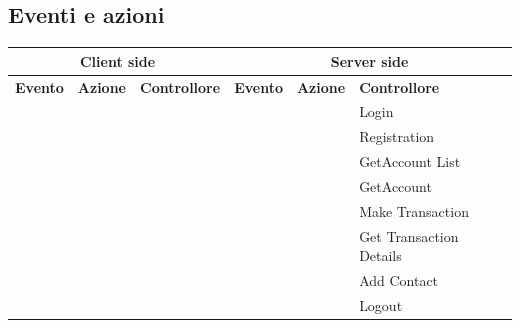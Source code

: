 \documentclass{article}
\begin{document}
\subsection{Eventi e azioni}
\begin{table}[H]
	\begin{center}
		\begin{tabular}{|p{2cm}|p{2cm}|p{2cm}|p{2cm}|p{2cm}|p{2cm}|}			
			\hline
			 \multicolumn{3}{|c|}{\textbf{Client side}} & \multicolumn{3}{c|}{\textbf{Server side}} \\
			 \hline
			 \textbf{Evento} & \textbf{Azione} & \textbf{Controllore} & \textbf{Evento} & \textbf{Azione} & \textbf{Controllore} \\
			\hline
			\centering{index → login form → submit} & \centering{Controllo dati} & \centering{function makeCall} &\centering{iPOST usr psw} & \centering{Controllo credenziali} & Login\\
			\hline
			\centering{registration → registration form → submit} & \centering{Controllo dati}  & \centering{function makeCall} &\centering{POST usr email psw control name surname} & \centering{Validazione e controllo dati e creazione utente} & Registration\\
			\hline
			\centering{AppPage → load} & \centering{Update view con lista account e update sidebar e navbar}  & \centering{function homeView} &\centering{GET} & \centering{Estrazione lista account dell'utente} & GetAccount List\\
			\hline
			\centering{AppPage → select account} & \centering{Update view con dettagli account  e update sidebar e navbar}  & \centering{function accountView} &\centering{GET accountId} & \centering{Estrazione dettagli account dell'utente} & GetAccount\\
			\hline
			\centering{AppPage → make transaction} & \centering{Controllo validità parametri}  & \centering{function makeCall} &\centering{POST origin destination amount reason username} & \centering{Validazione e verifica parametri e condizioni necessarie. Esecuzione della transazione} & Make Transaction\\
			\hline
			\centering{AppPage → show transaction outcome} & \centering{Update view con modal con dettagli della transazione}  & \centering{function transactionView} &\centering{GET transactionId} & \centering{Estrazione dettagli transazione} & Get Transaction Details\\
			\hline
			\centering{AppPage → add contact} & \centering{Update view con messaggio di esito aggiunta contatto}  & \centering{function makeCall} &\centering{POST account} & \centering{Controllo parametri e aggiunta contatto a rubrica} & Add Contact\\
			\hline
			\centering{AppPage → logout} & \centering{Pulizia localStorage}  & \centering{function logout()} &\centering{GET} & \centering{Chiusura della sessione} & Logout\\
			\hline
		\end{tabular}
	\end{center}
\end{table}
\end{document}
